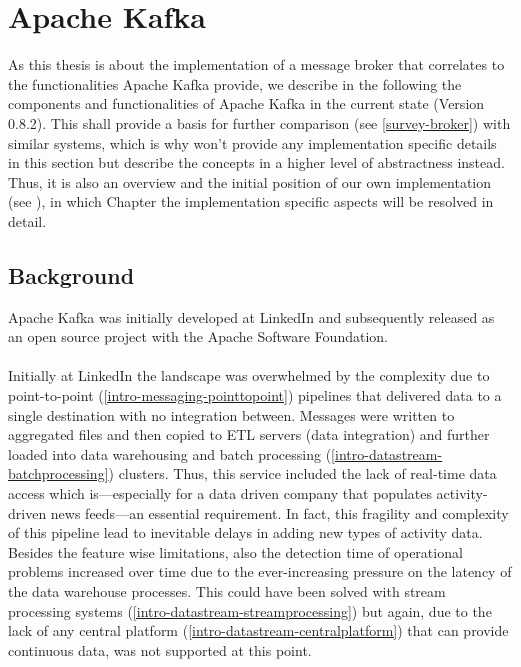 \chapter{Apache Kafka}
\label{intro-kafka}

As this thesis is about the implementation of a message broker that correlates
to the functionalities Apache Kafka provide, we describe in the following the
components and functionalities of Apache Kafka in the current state (Version
0.8.2). This shall provide a basis for further comparison (see \ref{survey-broker}) with
similar systems, which is why won't provide any implementation
specific details in this section but describe the concepts in a higher level of
abstractness instead. Thus, it is also an overview and the initial position of our
own implementation (see ), in which Chapter the implementation
specific aspects will be resolved in detail. 

\section{Background}

Apache Kafka was initially developed at LinkedIn\cite{linkedin} and subsequently
released as an open source project with the Apache Software
Foundation\cite{apachefoundation}. 
\\ \\
Initially at LinkedIn the landscape was overwhelmed by the complexity due to
point-to-point (\ref{intro-messaging-pointtopoint})
pipelines that delivered data to a single destination with no
integration between. Messages were written to aggregated files and then copied
to ETL servers (data integration) and further loaded into data warehousing and batch
processing (\ref{intro-datastream-batchprocessing})
clusters. Thus, this service included the lack of real-time data access which
is---especially for a data driven company that populates activity-driven news
feeds---an essential requirement. In fact, this fragility and complexity of this
pipeline lead to inevitable delays in adding new types of activity data.
Besides the feature wise limitations, also the detection time of operational
problems increased over time due to the ever-increasing pressure on the latency
of the data warehouse processes. This could have been solved with
stream processing systems (\ref{intro-datastream-streamprocessing}) but again, 
due to the lack of any central platform (\ref{intro-datastream-centralplatform})
that can provide continuous data, was not supported at this point.
\cite{goodhope2012building}

